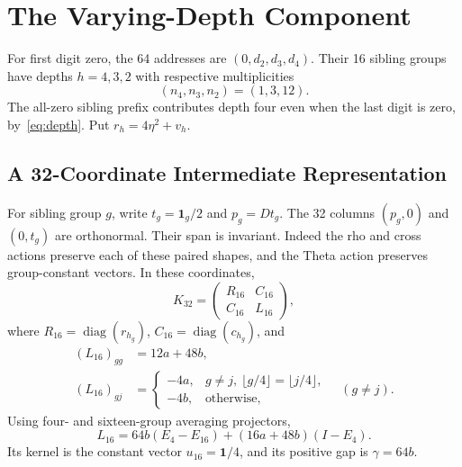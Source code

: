 \documentclass[journal,a4paper,10pt]{IEEEtran}
\theoremstyle{definition}\newtheorem{definition}[theorem]{Definition}
\theoremstyle{remark}\newtheorem{remark}[theorem]{Remark}
\newcommand{\one}{\mathbf 1}
\newcommand{\diag}{\operatorname{diag}}
\begin{document}
\section{The Varying-Depth Component}\label{sec:six}
For first digit zero, the 64 addresses are $(0,d_2,d_3,d_4)$. Their 16 sibling groups have depths $h=4,3,2$ with respective multiplicities
\begin{equation}\label{eq:n}
(n_4,n_3,n_2)=(1,3,12).
\end{equation}
The all-zero sibling prefix contributes depth four even when the last digit is zero, by~\eqref{eq:depth}. Put $r_h=4\eta^2+v_h$.

\subsection{A 32-Coordinate Intermediate Representation}
For sibling group $g$, write $t_g=\one_g/2$ and $p_g=Dt_g$. The 32 columns $(p_g,0)$ and $(0,t_g)$ are orthonormal. Their span is invariant. Indeed the rho and cross actions preserve each of these paired shapes, and the Theta action preserves group-constant vectors. In these coordinates,
\begin{equation}\label{eq:K32}
K_{32}=\begin{pmatrix}R_{16}&C_{16}\\C_{16}&L_{16}\end{pmatrix},
\end{equation}
where $R_{16}=\diag(r_{h_g})$, $C_{16}=\diag(c_{h_g})$, and
\begin{align}
(L_{16})_{gg}&=12a+48b,\nonumber\\
(L_{16})_{gj}&=\begin{cases}
-4a,&g\ne j,\ \lfloor g/4\rfloor=\lfloor j/4\rfloor,\\
-4b,&\text{otherwise},
\end{cases}\quad(g\ne j).
\end{align}
Using four- and sixteen-group averaging projectors,
\begin{equation}\label{eq:L16}
L_{16}=64b(E_4-E_{16})+(16a+48b)(I-E_4).
\end{equation}
Its kernel is the constant vector $u_{16}=\one/4$, and its positive gap is $\gamma=64b$.
\end{document}

